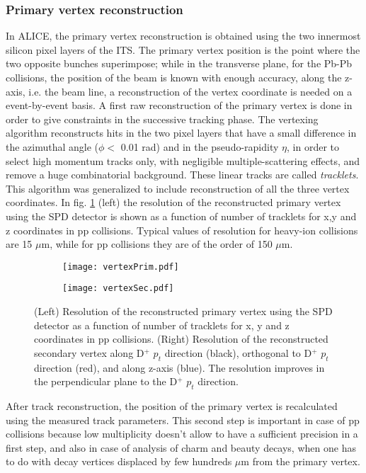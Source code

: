 \subsubsection{Primary vertex reconstruction}
In ALICE, the primary vertex reconstruction is obtained using the two innermost silicon pixel layers of the ITS. The primary vertex position is the point where the two opposite bunches superimpose; while in the transverse plane, for the Pb-Pb collisions, the position of the beam is known with enough accuracy, along the z-axis, i.e. the beam line, a reconstruction of the vertex coordinate is needed on a event-by-event basis.  A first raw reconstruction of the primary vertex is done in order to give constraints in the successive tracking phase. The vertexing algorithm reconstructs hits in the two pixel layers that have a small difference in the azimuthal angle ($\phi <$ 0.01 rad) and in the pseudo-rapidity $\eta$, in order to select high momentum tracks only, with negligible multiple-scattering effects, and remove a huge combinatorial background. These linear tracks are called \textit{tracklets}. This algorithm was generalized to include reconstruction of all the three vertex coordinates. In fig. \ref{fig:vertexer} (left) the resolution of the reconstructed primary vertex using the SPD detector is shown as a function of number of tracklets for x,y and z coordinates in pp collisions. Typical values of resolution for heavy-ion collisions are 15 $\mu$m, while for pp collisions  they are of the order of 150 $\mu$m.
\begin{figure}[!t]
\begin{subfigure}{0.5\textwidth}
\texttt{[image: vertexPrim.pdf]}
\end{subfigure}
\begin{subfigure}{0.5\textwidth}
\centering
\texttt{[image: vertexSec.pdf]}
\end{subfigure}
\caption{(Left) Resolution of the reconstructed primary vertex using the SPD detector as a function of number of tracklets for x, y and z coordinates in pp collisions. (Right) Resolution of the reconstructed secondary vertex along D$^+$ $p_t$ direction (black), orthogonal to D$^+$ $p_t$ direction (red), and along z-axis (blue). The resolution improves in the perpendicular plane to the D$^+$ $p_t$ direction.}
\label{fig:vertexer}
\end{figure}
After track reconstruction, the position of the primary vertex is recalculated using the measured track parameters. This second step is important in case of pp collisions because low multiplicity doesn't allow to have a sufficient precision in a first step, and also in case of analysis of charm and beauty decays, when one has to do with decay vertices displaced by few hundreds $\mu$m from the primary vertex. 

